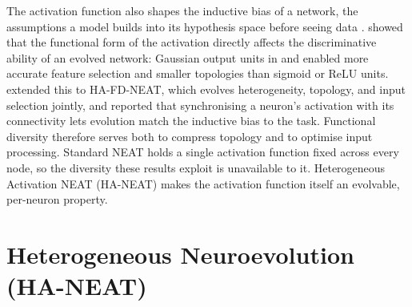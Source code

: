 The activation function also shapes the inductive bias of a network, the assumptions a model builds into its hypothesis space before seeing data \parencite{papavasileiou_importance_2017}.
\textcite{papavasileiou_importance_2017} showed that the functional form of the activation directly affects the discriminative ability of an evolved network: Gaussian output units in  and  enabled more accurate feature selection and smaller topologies than sigmoid or ReLU units.
\textcite{papavasileiou_optimizing_2022} extended this to HA-FD-NEAT, which evolves heterogeneity, topology, and input selection jointly, and reported that synchronising a neuron's activation with its connectivity lets evolution match the inductive bias to the task.
Functional diversity therefore serves both to compress topology and to optimise input processing.
Standard NEAT holds a single activation function fixed across every node, so the diversity these results exploit is unavailable to it.
Heterogeneous Activation NEAT (HA-NEAT) makes the activation function itself an evolvable, per-neuron property.




\section{Heterogeneous Neuroevolution (HA-NEAT)}
\label{subsec:haneat}

